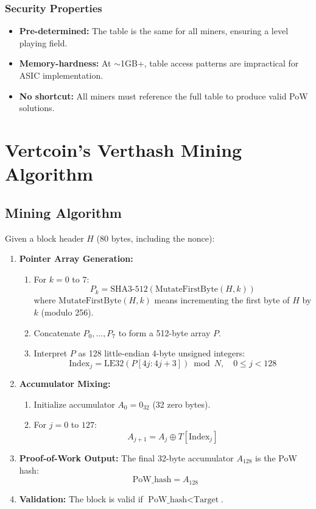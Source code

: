 \documentclass[12pt]{article}
\begin{document}
\subsubsection{Security Properties}

\begin{itemize}
    \item \textbf{Pre-determined:} The table is the same for all miners, ensuring a level playing field.
    \item \textbf{Memory-hardness:} At $\sim$1GB+, table access patterns are impractical for ASIC implementation.
    \item \textbf{No shortcut:} All miners must reference the full table to produce valid PoW solutions.
\end{itemize}

\section{Vertcoin's Verthash Mining Algorithm}

\subsection{Mining Algorithm}

Given a block header $H$ (80 bytes, including the nonce):

\begin{enumerate}
    \item \textbf{Pointer Array Generation:}
    \begin{enumerate}
        \item For $k = 0$ to $7$:
        \[
            P_k = \mathrm{SHA3}\text{-}512(\text{MutateFirstByte}(H, k))
        \]
        where $\text{MutateFirstByte}(H, k)$ means incrementing the first byte of $H$ by $k$ (modulo 256).
        \item Concatenate $P_0, \ldots, P_7$ to form a 512-byte array $P$.
        \item Interpret $P$ as 128 little-endian 4-byte unsigned integers:
        \[
            \text{Index}_j = \mathrm{LE32}(P[4j:4j+3]) \bmod N,\quad 0 \leq j < 128
        \]
    \end{enumerate}

    \item \textbf{Accumulator Mixing:}
    \begin{enumerate}
        \item Initialize accumulator $A_0 = 0_{32}$ (32 zero bytes).
        \item For $j = 0$ to $127$:
        \[
            A_{j+1} = A_j \oplus T[\text{Index}_j]
        \]
    \end{enumerate}

    \item \textbf{Proof-of-Work Output:}  
    The final 32-byte accumulator $A_{128}$ is the PoW hash:
    \[
        \text{PoW\_hash} = A_{128}
    \]

    \item \textbf{Validation:}  
    The block is valid if $\text{PoW\_hash} < \text{Target}$.
\end{enumerate}
\end{document}
